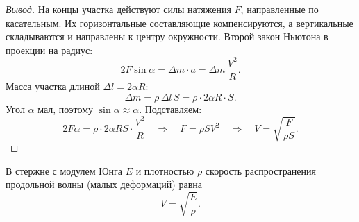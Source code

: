 \documentclass[12pt]{article}
\begin{document}
\begin{proof}[Вывод]
		На концы участка действуют силы натяжения $F$, направленные по касательным. Их горизонтальные составляющие компенсируются, а вертикальные складываются и направлены к центру окружности. Второй закон Ньютона в проекции на радиус:
		\[
			2F\sin\alpha = \varDelta m \cdot a = \varDelta m\,\frac{V^2}{R}.
		\]
		Масса участка длиной $\varDelta l = 2\alpha R$:
		\[
			\varDelta m = \rho\,\varDelta l\,S = \rho \cdot 2\alpha R \cdot S.
		\]
		Угол $\alpha$ мал, поэтому $\sin\alpha \approx \alpha$. Подставляем:
		\[
			2F\alpha = \rho \cdot 2\alpha R S \cdot \frac{V^2}{R} \quad \Longrightarrow \quad F = \rho S V^2 \quad \Longrightarrow \quad V = \sqrt{\frac{F}{\rho S}}.
		\]
	\end{proof}

	\begin{statement}
		В стержне с модулем Юнга $E$ и плотностью $\rho$ скорость распространения продольной волны (малых деформаций) равна
		\[
			V = \sqrt{\frac{E}{\rho}}.
		\]
	\end{statement}
\end{document}
